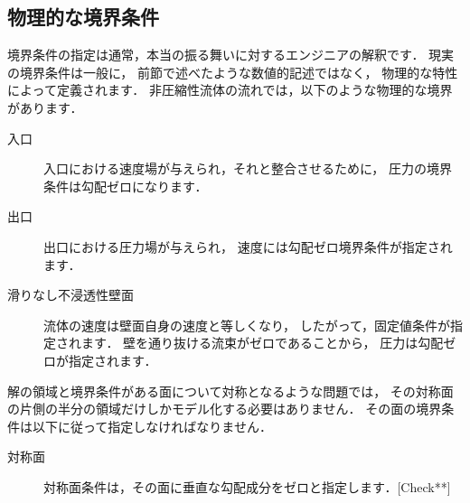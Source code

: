 \subsection{物理的な境界条件}
\label{ssec:2.6.1}
境界条件の指定は通常，本当の振る舞いに対するエンジニアの解釈です．
現実の境界条件は一般に，
前節で述べたような数値的記述ではなく，
物理的な特性によって定義されます．
非圧縮性流体の流れでは，以下のような物理的な境界があります．
\begin{description}
 \item[入口] 入口における速度場が与えられ，それと整合させるために，
            圧力の境界条件は勾配ゼロになります．
 \item[出口] 出口における圧力場が与えられ，
            速度には勾配ゼロ境界条件が指定されます．
 \item[滑りなし不浸透性壁面] 流体の速度は壁面自身の速度と等しくなり，
            したがって，固定値条件が指定されます．
            壁を通り抜ける流束がゼロであることから，
            圧力は勾配ゼロが指定されます．
\end{description}

解の領域と境界条件がある面について対称となるような問題では，
その対称面の片側の半分の領域だけしかモデル化する必要はありません．
その面の境界条件は以下に従って指定しなければなりません．
\begin{description}
 \item[対称面] 対称面条件は，その面に垂直な勾配成分をゼロと指定します．[Check**]
\end{description}
